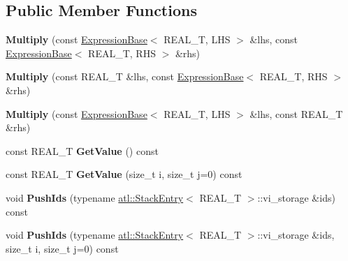 \subsection*{Public Member Functions}
\begin{DoxyCompactItemize}
\item 
\hypertarget{structatl_1_1_multiply_a71353c701201490c6ee810658d4fb953}{{\bfseries Multiply} (const \hyperlink{structatl_1_1_expression_base}{Expression\+Base}$<$ R\+E\+A\+L\+\_\+\+T, L\+H\+S $>$ \&lhs, const \hyperlink{structatl_1_1_expression_base}{Expression\+Base}$<$ R\+E\+A\+L\+\_\+\+T, R\+H\+S $>$ \&rhs)}\label{structatl_1_1_multiply_a71353c701201490c6ee810658d4fb953}

\item 
\hypertarget{structatl_1_1_multiply_ac614c1ef3b3c6bf4e46dadf8d9b0538b}{{\bfseries Multiply} (const R\+E\+A\+L\+\_\+\+T \&lhs, const \hyperlink{structatl_1_1_expression_base}{Expression\+Base}$<$ R\+E\+A\+L\+\_\+\+T, R\+H\+S $>$ \&rhs)}\label{structatl_1_1_multiply_ac614c1ef3b3c6bf4e46dadf8d9b0538b}

\item 
\hypertarget{structatl_1_1_multiply_a7b863518694411a59bc103be12d73cbb}{{\bfseries Multiply} (const \hyperlink{structatl_1_1_expression_base}{Expression\+Base}$<$ R\+E\+A\+L\+\_\+\+T, L\+H\+S $>$ \&lhs, const R\+E\+A\+L\+\_\+\+T \&rhs)}\label{structatl_1_1_multiply_a7b863518694411a59bc103be12d73cbb}

\item 
\hypertarget{structatl_1_1_multiply_a2ea701e5cef0632f5c27cb626e1f165f}{const R\+E\+A\+L\+\_\+\+T {\bfseries Get\+Value} () const }\label{structatl_1_1_multiply_a2ea701e5cef0632f5c27cb626e1f165f}

\item 
\hypertarget{structatl_1_1_multiply_a5a28954726bf2016e94564e587013c7f}{const R\+E\+A\+L\+\_\+\+T {\bfseries Get\+Value} (size\+\_\+t i, size\+\_\+t j=0) const }\label{structatl_1_1_multiply_a5a28954726bf2016e94564e587013c7f}

\item 
\hypertarget{structatl_1_1_multiply_ad2a09b1cf0d1dbe48b3a532cba272eeb}{void {\bfseries Push\+Ids} (typename \hyperlink{structatl_1_1_stack_entry}{atl\+::\+Stack\+Entry}$<$ R\+E\+A\+L\+\_\+\+T $>$\+::vi\+\_\+storage \&ids) const }\label{structatl_1_1_multiply_ad2a09b1cf0d1dbe48b3a532cba272eeb}

\item 
\hypertarget{structatl_1_1_multiply_a90777da934335b5320b4975fbeb332fc}{void {\bfseries Push\+Ids} (typename \hyperlink{structatl_1_1_stack_entry}{atl\+::\+Stack\+Entry}$<$ R\+E\+A\+L\+\_\+\+T $>$\+::vi\+\_\+storage \&ids, size\+\_\+t i, size\+\_\+t j=0) const }\label{structatl_1_1_multiply_a90777da934335b5320b4975fbeb332fc}


\end{DoxyCompactItemize}
